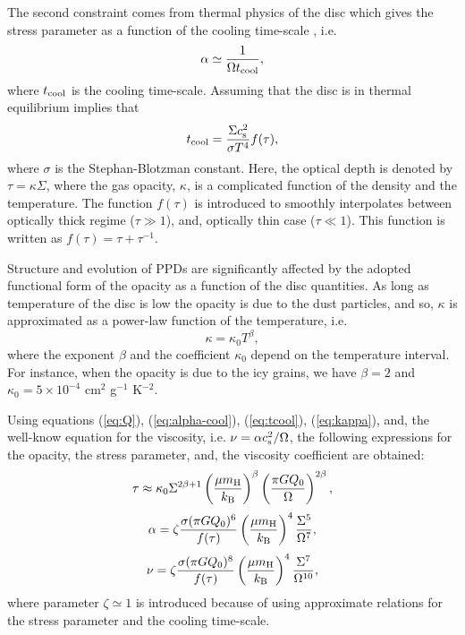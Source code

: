 \documentclass[apj]{emulateapj}
\begin{document}
The second constraint comes from thermal physics of the disc which gives the stress parameter as a function of the cooling time-scale \cite[e.g.,][]{gami}, i.e.
%
\begin{equation}\label{eq:alpha-cool}
\alpha \simeq \frac{1}{\Omega t_{\rm cool}},
\end{equation}
%
where $t_{\rm cool}$ is the cooling time-scale. Assuming that the disc is in thermal equilibrium implies that
%
\begin{equation}\label{eq:tcool}
t_{\rm cool} = \frac{\Sigma c_{\rm s}^2}{\sigma T^4} f(\tau),
\end{equation}
%
where $\sigma$ is the Stephan-Blotzman constant. Here, the optical depth is denoted by $\tau = \kappa \Sigma$, where  the gas opacity, $\kappa$, is a complicated function of the density and the temperature. The function $f(\tau)$ is introduced to smoothly interpolates between optically thick regime ($\tau \gg 1$), and, optically thin case ($\tau \ll 1$). This function is written as $f(\tau ) = \tau + \tau^{-1}$.

Structure and evolution of PPDs are significantly affected by the adopted  functional form of the opacity as a function of the disc quantities. As long as  temperature of the disc is low the opacity is due to the dust particles, and so, $\kappa$ is approximated as a  power-law function of the temperature, i.e.
%
\begin{equation}\label{eq:kappa}
\kappa = \kappa_0 T^{\beta},
\end{equation}
%
where the exponent $\beta$ and the coefficient $\kappa_0$ depend on the temperature interval. For instance, when the opacity is due to the icy grains, we have $\beta =2$ and $\kappa_0 = 5\times 10^{-4}$ cm$^2$ g$^{-1}$ K$^{-2}$.  


Using equations (\ref{eq:Q}), (\ref{eq:alpha-cool}), (\ref{eq:tcool}),  (\ref{eq:kappa}), and, the well-know equation for the viscosity, i.e. $\nu = \alpha c_{\rm s}^2 / \Omega $, the following expressions  for the opacity, the stress parameter, and, the viscosity coefficient are obtained:
%
%
%
 \begin{equation}\label{eq:tau}
\tau \approx \kappa_0 \Sigma^{2\beta + 1} \left ( \frac{\mu m_{\rm H}}{k_{\rm B}}\right )^{\beta} \left ( \frac{\pi G Q_0 }{\Omega}\right )^{2\beta},
 \end{equation}
%
%
\begin{equation}\label{eq:alpha}
\alpha = \zeta \frac{\sigma (\pi G Q_0 )^6}{f(\tau )} \left ( \frac{\mu m_{\rm H}}{k_{\rm B}}\right )^4 \frac{\Sigma^5}{\Omega^7},
\end{equation}
%
\begin{equation}\label{eq:nu}
\nu = \zeta  \frac{\sigma (\pi G Q_0 )^8}{f(\tau )} \left ( \frac{\mu m_{\rm H}}{k_{\rm B}}\right )^4 \frac{\Sigma^7}{\Omega^{10}},
\end{equation}
%
%
where parameter $\zeta \simeq 1$  is introduced because of using approximate relations for the stress parameter and the cooling time-scale.
\end{document}
